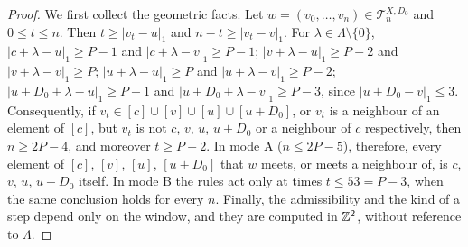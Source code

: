 \begin{proof}
We first collect the geometric facts. Let $w = (v_0, \dots, v_n) \in \mathcal T^{X, D_0}_n$ and $0 \le t \le n$. Then $t \ge |v_t - u|_1$ and $n - t \ge |v_t - v|_1$. For $\lambda \in \Lambda \setminus \{0\}$, $|c + \lambda - u|_1 \ge P - 1$ and $|c + \lambda - v|_1 \ge P - 1$; $|v + \lambda - u|_1 \ge P - 2$ and $|v + \lambda - v|_1 \ge P$; $|u + \lambda - u|_1 \ge P$ and $|u + \lambda - v|_1 \ge P - 2$; $|u + D_0 + \lambda - u|_1 \ge P - 1$ and $|u + D_0 + \lambda - v|_1 \ge P - 3$, since $|u + D_0 - v|_1 \le 3$. Consequently, if $v_t \in [c] \cup [v] \cup [u] \cup [u + D_0]$, or $v_t$ is a neighbour of an element of $[c]$, but $v_t$ is not $c$, $v$, $u$, $u + D_0$ or a neighbour of $c$ respectively, then $n \ge 2P - 4$, and moreover $t \ge P - 2$. In mode A ($n \le 2P - 5$), therefore, every element of $[c]$, $[v]$, $[u]$, $[u + D_0]$ that $w$ meets, or meets a neighbour of, is $c$, $v$, $u$, $u + D_0$ itself. In mode B the rules act only at times $t \le 53 = P - 3$, when the same conclusion holds for every $n$. Finally, the admissibility and the kind of a step depend only on the window, and they are computed in $\mathbb{Z}^2$, without reference to $\Lambda$.


\end{proof}
